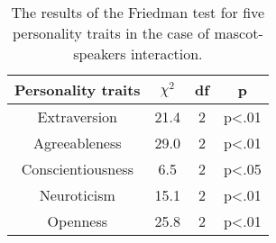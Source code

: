 \begin{table}[hbt!]
    \renewcommand{\arraystretch}{1}
    \begin{center}
        \begin{tabular}{|c|c|c|c|}
            \hline
            \textbf{Personality traits} & \textbf{$\chi^2$} & \textbf{df} & \textbf{p} \\
            \hline
            Extraversion &21.4 &2 &p<.01 \\
            \hline
            Agreeableness &29.0 &2 &p<.01\\
            \hline
            Conscientiousness &6.5 &2 &p<.05\\
            \hline
            Neuroticism &15.1 &2 &p<.01 \\
            \hline
            Openness &25.8 &2 &p<.01 \\
            \hline
        \end{tabular}
        \caption{The results of the Friedman test for five personality traits in the case of mascot-speakers interaction.}
        \label{table:friedmanMS1}
    \end{center}
\end{table}

